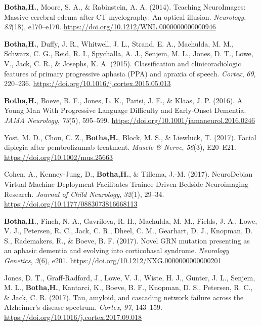 \documentclass[11pt, a4paper]{awesome-cv}
\begin{document}
\leavevmode\hypertarget{ref-botha_teaching_2014}{}%
\textbf{Botha,H.}, Moore, S. A., \& Rabinstein, A. A. (2014). Teaching
{NeuroImages}: {Massive} cerebral edema after {CT} myelography: {An}
optical illusion. \emph{Neurology}, \emph{83}(18), e170--e170.
\url{https://doi.org/10.1212/WNL.0000000000000946}

\leavevmode\hypertarget{ref-botha_classification_2015}{}%
\textbf{Botha,H.}, Duffy, J. R., Whitwell, J. L., Strand, E. A.,
Machulda, M. M., Schwarz, C. G., Reid, R. I., Spychalla, A. J., Senjem,
M. L., Jones, D. T., Lowe, V., Jack, C. R., \& Josephs, K. A. (2015).
Classification and clinicoradiologic features of primary progressive
aphasia ({PPA}) and apraxia of speech. \emph{Cortex}, \emph{69},
220--236. \url{https://doi.org/10.1016/j.cortex.2015.05.013}

\leavevmode\hypertarget{ref-botha_young_2016}{}%
\textbf{Botha,H.}, Boeve, B. F., Jones, L. K., Parisi, J. E., \& Klaas,
J. P. (2016). A {Young} {Man} {With} {Progressive} {Language}
{Difficulty} and {Early}-{Onset} {Dementia}. \emph{JAMA Neurology},
\emph{73}(5), 595--599.
\url{https://doi.org/10.1001/jamaneurol.2016.0246}

\leavevmode\hypertarget{ref-yost_facial_2017}{}%
Yost, M. D., Chou, C. Z., \textbf{Botha,H.}, Block, M. S., \& Liewluck,
T. (2017). Facial diplegia after pembrolizumab treatment. \emph{Muscle
\& Nerve}, \emph{56}(3), E20--E21.
\url{https://doi.org/10.1002/mus.25663}

\leavevmode\hypertarget{ref-cohen_neurodebian_2017}{}%
Cohen, A., Kenney-Jung, D., \textbf{Botha,H.}, \& Tillema, J.-M. (2017).
{NeuroDebian} {Virtual} {Machine} {Deployment} {Facilitates}
{Trainee}-{Driven} {Bedside} {Neuroimaging} {Research}. \emph{Journal of
Child Neurology}, \emph{32}(1), 29--34.
\url{https://doi.org/10.1177/0883073816668113}

\leavevmode\hypertarget{ref-botha_novel_2017}{}%
\textbf{Botha,H.}, Finch, N. A., Gavrilova, R. H., Machulda, M. M.,
Fields, J. A., Lowe, V. J., Petersen, R. C., Jack, C. R., Dheel, C. M.,
Gearhart, D. J., Knopman, D. S., Rademakers, R., \& Boeve, B. F. (2017).
Novel {GRN} mutation presenting as an aphasic dementia and evolving into
corticobasal syndrome. \emph{Neurology Genetics}, \emph{3}(6), e201.
\url{https://doi.org/10.1212/NXG.0000000000000201}

\leavevmode\hypertarget{ref-jones_tau_2017}{}%
Jones, D. T., Graff-Radford, J., Lowe, V. J., Wiste, H. J., Gunter, J.
L., Senjem, M. L., \textbf{Botha,H.}, Kantarci, K., Boeve, B. F.,
Knopman, D. S., Petersen, R. C., \& Jack, C. R. (2017). Tau, amyloid,
and cascading network failure across the {Alzheimer}'s disease spectrum.
\emph{Cortex}, \emph{97}, 143--159.
\url{https://doi.org/10.1016/j.cortex.2017.09.018}
\end{document}
